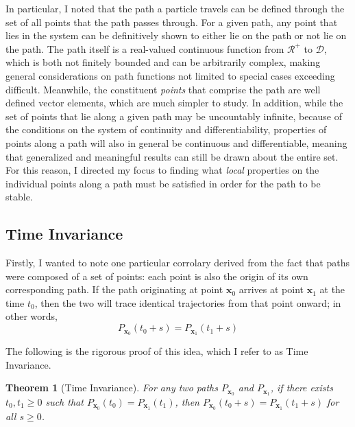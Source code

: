 \documentclass{article}
\newcommand{\B}[1]{\boldsymbol{#1}}
\newtheorem{theorem}{Theorem}[section]
\theoremstyle{definition}
\theoremstyle{remark}
\begin{document}
In particular, I noted that the path a particle travels can be defined through 
the set of all points that the path passes through. For a given path, any point that lies 
in the system can be definitively shown to either lie on the path or not lie on the path. 
The path itself is a real-valued continuous function from $\mathcal{R}^+$ to $\mathcal{D}$,
which is both not finitely bounded and can be arbitrarily complex, making general considerations
on path functions not limited to special cases exceeding difficult. Meanwhile, the constituent \textit{points}
that comprise the path are well defined vector elements, which are much simpler to study. In addition, 
while the set of points that lie along a given path may be uncountably infinite,
because of the conditions on the system of continuity and differentiability, properties of points along 
a path will also in general be continuous and differentiable, meaning that generalized and meaningful results
can still be drawn about the entire set. For this reason, I directed my focus to finding what \textit{local} 
properties on the individual points along a path must be satisfied in order for the path to be stable.  

\subsection{Time Invariance}
Firstly, I wanted to note one particular corrolary derived from the fact that paths were
composed of a set of points: each point is also the origin of its own corresponding path.
If the path originating at point $\B{x}_0$ arrives at point $\B{x}_1$ at the time $t_0$,
then the two will trace identical trajectories from that point onward; in other words,
$$P_{\B{x}_0}(t_0 + s) = P_{\B{x}_1}(t_1 + s)$$

The following is the rigorous proof of this idea, which I refer to as Time Invariance. 

\begin{theorem}[Time Invariance]
  \label{Time Invariance}
  For any two paths $P_{\B{x}_0}$ and $P_{\B{x}_1}$, if there exists $t_0, t_1 \geq 0$ such that
  $P_{\B{x}_0}(t_0) = P_{\B{x}_1}(t_1)$, then $P_{\B{x}_0}(t_0 + s) = P_{\B{x}_1}(t_1 + s)$ for all $s \geq 0$.
\end{theorem}
\end{document}
